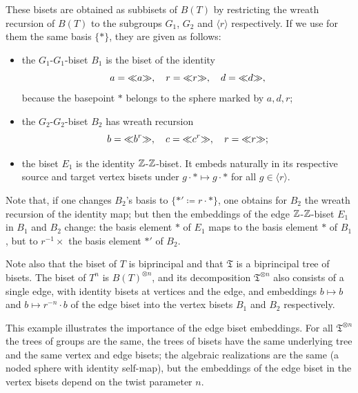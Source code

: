 \documentclass{amsart}
\begin{document}
These bisets are obtained as subbisets of $B(T)$ by restricting the
wreath recursion of $B(T)$ to the subgroups $G_1$, $G_2$ and
$\langle r\rangle$ respectively. If we use for them the same basis
$\{*\}$, they are given as follows:
\begin{itemize}
\item the $G_1$-$G_1$-biset $B_1$ is the biset of the identity
  \[a={\ll}a{\gg},\quad r={\ll}r{\gg},\quad d={\ll}d{\gg},
  \]
  because the basepoint $*$ belongs to the sphere marked by $a,d,r$;
\item the $G_2$-$G_2$-biset $B_2$ has wreath recursion
  \[b={\ll}b^r{\gg},\quad c={\ll}c^r{\gg},\quad r={\ll}r{\gg};\]
\item the biset $E_1$ is the identity ${\mathbb Z}$-${\mathbb Z}$-biset. It embeds
  naturally in its respective source and target vertex bisets under
  $g\cdot*\mapsto g\cdot *$ for all $g\in\langle r\rangle$.
\end{itemize}
Note that, if one changes $B_2$'s basis to $\{*'\coloneqq r\cdot *\}$,
one obtains for $B_2$ the wreath recursion of the identity map; but
then the embeddings of the edge ${\mathbb Z}$-${\mathbb Z}$-biset $E_1$ in $B_1$ and
$B_2$ change: the basis element $*$ of $E_1$ maps to the basis element
$*$ of $B_1$, but to $r^{-1}\times$ the basis element $*'$ of $B_2$.

Note also that the biset of $T$ is biprincipal and that $\mathfrak T$
is a biprincipal tree of bisets. The biset of $T^n$ is
$B(T)^{\otimes n}$, and its decomposition $\mathfrak T^{\otimes n}$
also consists of a single edge, with identity bisets at vertices and
the edge, and embeddings $b\mapsto b$ and $b\mapsto r^{-n}\cdot b$ of
the edge biset into the vertex bisets $B_1$ and $B_2$ respectively.

This example illustrates the importance of the edge biset
embeddings. For all $\mathfrak T^{\otimes n}$ the trees of groups are
the same, the trees of bisets have the same underlying tree and the
same vertex and edge bisets; the algebraic realizations are the same
(a noded sphere with identity self-map), but the embeddings of the edge
biset in the vertex bisets depend on the twist parameter $n$.
\end{document}
